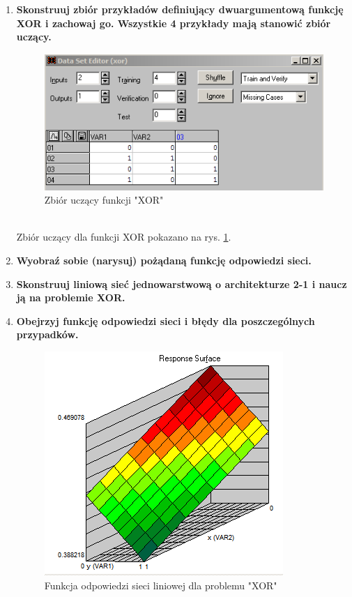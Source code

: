 \begin{enumerate}
\item \textbf{
Skonstruuj zbiór przykładów definiujący dwuargumentową funkcję XOR i zachowaj go. Wszystkie 4 przykłady mają stanowić zbiór uczący.}
\begin{figure}[h]
\centering
\includegraphics[scale=0.75]{dane/part1/zad2/dataset_xor}
\caption{Zbiór uczący funkcji "XOR"\label{fig:dataset_xor}}
\end{figure}
\\Zbiór uczący dla funkcji XOR pokazano na rys. \ref{fig:dataset_xor}. 

\item \textbf{
Wyobraź sobie (narysuj) pożądaną funkcję odpowiedzi sieci.}

\item \textbf{
Skonstruuj liniową sieć jednowarstwową o architekturze 2-1 i naucz ją na problemie XOR.}

\item \textbf{ Obejrzyj funkcję odpowiedzi sieci i błędy dla poszczególnych przypadków.}
\begin{figure}[h]
\centering
\includegraphics[scale=0.75]{dane/part1/zad2/response_xor}
\caption{Funkcja odpowiedzi sieci liniowej dla problemu "XOR"\label{fig:response_linear_xor}}
\end{figure}


\end{enumerate}
